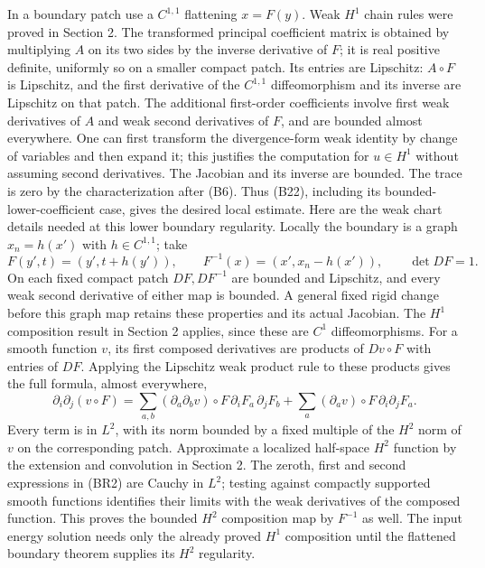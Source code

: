 \documentclass[
  11pt,
]{article}
\begin{document}
In a boundary patch use a \(C^{1,1}\) flattening \(x=F(y)\). Weak
\(H^1\) chain rules were proved in Section 2. The transformed principal
coefficient matrix is obtained by multiplying \(A\) on its two sides by
the inverse derivative of \(F\); it is real positive definite, uniformly
so on a smaller compact patch. Its entries are Lipschitz: \(A\circ F\)
is Lipschitz, and the first derivative of the \(C^{1,1}\) diffeomorphism
and its inverse are Lipschitz on that patch. The additional first-order
coefficients involve first weak derivatives of \(A\) and weak second
derivatives of \(F\), and are bounded almost everywhere. One can first
transform the divergence-form weak identity by change of variables and
then expand it; this justifies the computation for \(u\in H^1\) without
assuming second derivatives. The Jacobian and its inverse are bounded.
The trace is zero by the characterization after (B6). Thus (B22),
including its bounded-lower-coefficient case, gives the desired local
estimate. Here are the weak chart details needed at this lower boundary
regularity. Locally the boundary is a graph \(x_n=h(x')\) with
\(h\in C^{1,1}\); take \[
 F(y',t)=(y',t+h(y')),\qquad
 F^{-1}(x)=(x',x_n-h(x')),\qquad \det DF=1.
 \tag{BR1}
\] On each fixed compact patch \(DF,DF^{-1}\) are bounded and Lipschitz,
and every weak second derivative of either map is bounded. A general
fixed rigid change before this graph map retains these properties and
its actual Jacobian. The \(H^1\) composition result in Section 2
applies, since these are \(C^1\) diffeomorphisms. For a smooth function
\(v\), its first composed derivatives are products of \(Dv\circ F\) with
entries of \(DF\). Applying the Lipschitz weak product rule to these
products gives the full formula, almost everywhere, \[
 \partial_i\partial_j(v\circ F)
 =\sum_{a,b}(\partial_a\partial_bv)\circ F\,
       \partial_iF_a\,\partial_jF_b
   +\sum_a(\partial_av)\circ F\,\partial_i\partial_jF_a.
 \tag{BR2}
\] Every term is in \(L^2\), with its norm bounded by a fixed multiple
of the \(H^2\) norm of \(v\) on the corresponding patch. Approximate a
localized half-space \(H^2\) function by the extension and convolution
in Section 2. The zeroth, first and second expressions in (BR2) are
Cauchy in \(L^2\); testing against compactly supported smooth functions
identifies their limits with the weak derivatives of the composed
function. This proves the bounded \(H^2\) composition map by \(F^{-1}\)
as well. The input energy solution needs only the already proved \(H^1\)
composition until the flattened boundary theorem supplies its \(H^2\)
regularity.
\end{document}
